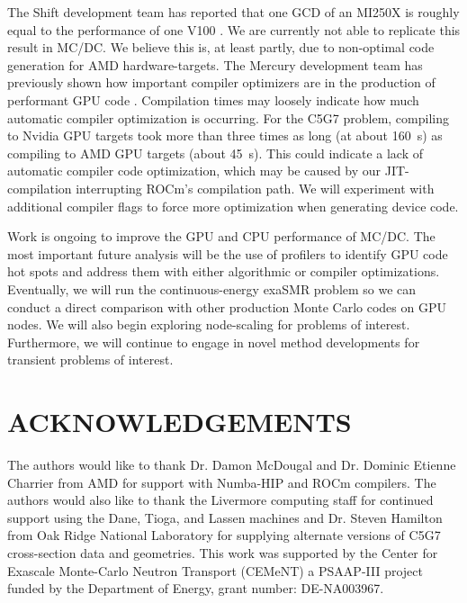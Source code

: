 The Shift development team has reported that one GCD of an MI250X is roughly equal to the performance of one V100 \cite{mcsummit}.
We are currently not able to replicate this result in MC/DC.
We believe this is, at least partly, due to non-optimal code generation for AMD hardware-targets.
The Mercury development team has previously shown how important compiler optimizers are in the production of performant GPU code \cite{pozulp_progress_2023}.
Compilation times may loosely indicate how much automatic compiler optimization is occurring.
For the C5G7 problem, compiling to Nvidia GPU targets took more than three times as long (at about \SI{160}{s}) as compiling to AMD GPU targets (about \SI{45}{s}).
This could indicate a lack of automatic compiler code optimization, which may be caused by our JIT-compilation interrupting ROCm's compilation path.
We will experiment with additional compiler flags to force more optimization when generating device code.



Work is ongoing to improve the GPU and CPU performance of MC/DC.
The most important future analysis will be the use of profilers to identify GPU code hot spots and address them with either algorithmic or compiler optimizations.
Eventually, we will run the continuous-energy exaSMR problem so we can conduct a direct comparison with other production Monte Carlo codes on GPU nodes.
We will also begin exploring node-scaling for problems of interest.
Furthermore, we will continue to engage in novel method developments for transient problems of interest.


\section*{ACKNOWLEDGEMENTS}
The authors would like to thank Dr. Damon McDougal and Dr. Dominic Etienne Charrier from AMD for support with Numba-HIP and ROCm compilers.
The authors would also like to thank the Livermore computing staff for continued support using the Dane, Tioga, and Lassen machines and Dr. Steven Hamilton from Oak Ridge National Laboratory for supplying alternate versions of C5G7 cross-section data and geometries.
This work was supported by the Center for Exascale Monte-Carlo Neutron Transport (CEMeNT) a PSAAP-III project funded by the Department of Energy, grant number: DE-NA003967.